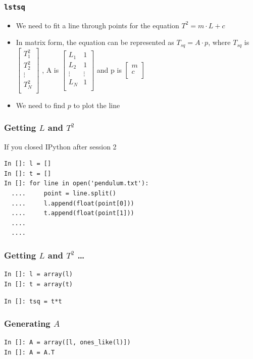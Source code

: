 \documentclass[14pt,compress]{beamer}
\newcommand{\typ}[1]{\lstinline{#1}}
\begin{document}
\begin{frame}[fragile]
\frametitle{\typ{lstsq}}
\begin{itemize}
\item We need to fit a line through points for the equation $T^2 = m \cdot L+c$
\item In matrix form, the equation can be represented as $T_{sq} = A \cdot p$, where $T_{sq}$ is
  $\begin{bmatrix}
  T^2_1 \\
  T^2_2 \\
  \vdots\\
  T^2_N \\
  \end{bmatrix}$
, A is   
  $\begin{bmatrix}
  L_1 & 1 \\
  L_2 & 1 \\
  \vdots & \vdots\\
  L_N & 1 \\
  \end{bmatrix}$
  and p is 
  $\begin{bmatrix}
  m\\
  c\\
  \end{bmatrix}$
\item We need to find $p$ to plot the line
\end{itemize}
\end{frame}

\begin{frame}[fragile]
\frametitle{Getting $L$ and $T^2$}
If you \alert{closed} IPython after session 2
\begin{lstlisting}
In []: l = []
In []: t = []
In []: for line in open('pendulum.txt'):
  ....     point = line.split()
  ....     l.append(float(point[0]))
  ....     t.append(float(point[1]))
  ....
  ....
\end{lstlisting}
\end{frame}

\begin{frame}[fragile]
\frametitle{Getting $L$ and $T^2$ \dots}
\begin{lstlisting}
In []: l = array(l)
In []: t = array(t)
\end{lstlisting}
\alert{\typ{In []: tsq = t*t}}
\end{frame}
 
\begin{frame}[fragile]
\frametitle{Generating $A$}
\begin{lstlisting}
In []: A = array([l, ones_like(l)])
In []: A = A.T
\end{lstlisting}
\end{frame}
\end{document}
